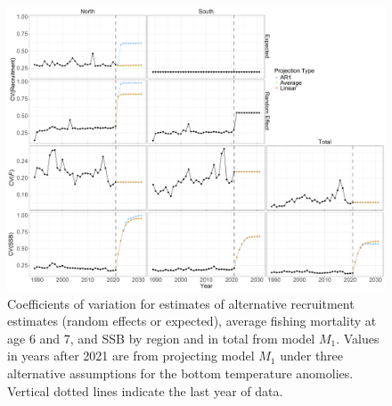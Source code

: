 \documentclass[
]{article}
\begin{document}
\begin{landscape}

\begin{figure}

{\centering \includegraphics[height=0.9\textheight]{R_SSB_F_cv_results} 

}

\caption{Coefficients of variation for estimates of alternative recruitment estimates (random effects or expected), average fishing mortality at age 6 and 7, and SSB by region and in total from model $M_1$. Values in years after 2021 are from projecting model $M_1$ under three alternative assumptions for the bottom temperature anomolies. Vertical dotted lines indicate the last year of data.}\label{fig:R-F-SSB-CVs}
\end{figure}
\end{landscape}
\end{document}
